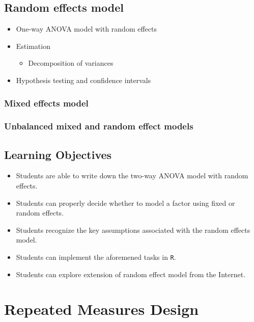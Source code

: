 \documentclass[12pt,]{book}
\providecommand{\tightlist}{%
  \setlength{\itemsep}{0pt}\setlength{\parskip}{0pt}}
\begin{document}
\section{Random effects model}\label{random-effects-model}

\begin{itemize}
\tightlist
\item
  One-way ANOVA model with random effects
\item
  Estimation

  \begin{itemize}
  \tightlist
  \item
    Decomposition of variances
  \end{itemize}
\item
  Hypothesis testing and confidence intervals
\end{itemize}

\subsection{Mixed effects model}\label{mixed-effects-model}

\subsection{Unbalanced mixed and random effect
models}\label{unbalanced-mixed-and-random-effect-models}

\section{Learning Objectives}\label{learning-objectives-3}

\begin{itemize}
\tightlist
\item
  Students are able to write down the two-way ANOVA model with random
  effects.
\item
  Students can properly decide whether to model a factor using fixed or
  random effects.
\item
  Students recognize the key assumptions associated with the random
  effects model.
\item
  Students can implement the aforemened tasks in \texttt{R}.
\item
  Students can explore extension of random effect model from the
  Internet.
\end{itemize}

\chapter{Repeated Measures Design}\label{ch:repeated}
\end{document}
